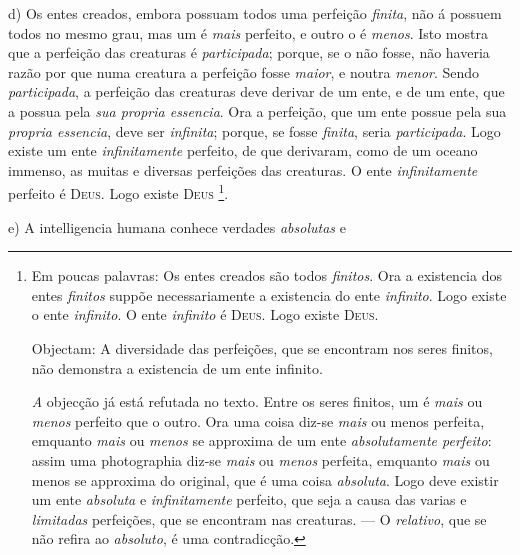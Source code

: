  d) Os entes creados, embora possuam todos uma perfeição \emph{finita}, não á possuem todos no mesmo grau, mas um é \emph{mais} perfeito, e outro o é \emph{menos}. Isto mostra que a perfeição das creaturas é \emph{participada}; porque, se o não fosse, não haveria razão por que numa creatura a perfeição fosse \emph{maior}, e noutra \emph{menor}. Sendo \emph{participada}, a perfeição das creaturas deve derivar de um ente, e de um ente, que a possua pela \emph{sua propria essencia}. Ora a perfeição, que um ente possue pela sua \emph{propria essencia}, deve ser \emph{infinita}; porque, se fosse \emph{finita}, seria \emph{participada}. Logo existe um ente \emph{infinitamente} perfeito, de que derivaram, como de um oceano immenso, as muitas e diversas perfeições das creaturas. O ente \emph{infinitamente} perfeito é \textsc{Deus}. Logo existe \textsc{Deus} \footnote{Em poucas palavras: Os entes creados são todos \emph{finitos}. Ora a existencia dos entes \emph{finitos} suppõe necessariamente a existencia do ente \emph{infinito}. Logo existe o ente \emph{infinito}. O ente \emph{infinito} é \textsc{Deus}. Logo existe \textsc{Deus}.\par Objectam: A diversidade das perfeições, que se encontram nos seres finitos, não demonstra a existencia de um ente infinito.\par \emph{A} objecção já está refutada no texto. Entre os seres finitos, um é \emph{mais} ou \emph{menos} perfeito que o outro. Ora uma coisa diz-se \emph{mais} ou menos perfeita, emquanto \emph{mais} ou \emph{menos} se approxima de um ente \emph{absolutamente perfeito}: assim uma photographia diz-se \emph{mais} ou \emph{menos} perfeita, emquanto \emph{mais} ou menos se approxima do original, que é uma coisa \emph{absoluta}. Logo deve existir um ente \emph{absoluta} e \emph{infinitamente} perfeito, que seja a causa das varias e \emph{limitadas} perfeições, que se encontram nas creaturas. --- O \emph{relativo}, que se não refira ao \emph{absoluto}, é uma contradicção.}.

e) A intelligencia humana conhece verdades \emph{absolutas} e

